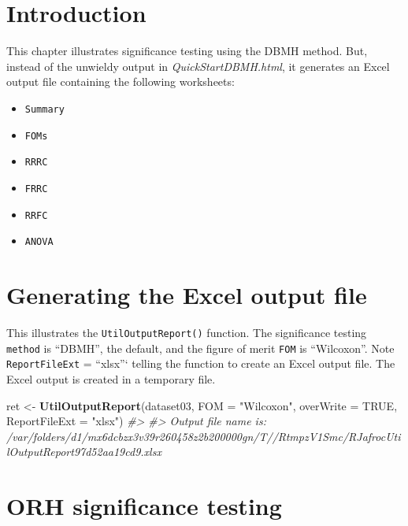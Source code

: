 \documentclass[
]{book}
\newenvironment{Shaded}{\begin{snugshade}}{\end{snugshade}}
\newcommand{\CommentTok}[1]{\textcolor[rgb]{0.56,0.35,0.01}{\textit{#1}}}
\newcommand{\DataTypeTok}[1]{\textcolor[rgb]{0.13,0.29,0.53}{#1}}
\newcommand{\KeywordTok}[1]{\textcolor[rgb]{0.13,0.29,0.53}{\textbf{#1}}}
\newcommand{\NormalTok}[1]{#1}
\newcommand{\OtherTok}[1]{\textcolor[rgb]{0.56,0.35,0.01}{#1}}
\newcommand{\StringTok}[1]{\textcolor[rgb]{0.31,0.60,0.02}{#1}}
\providecommand{\tightlist}{%
  \setlength{\itemsep}{0pt}\setlength{\parskip}{0pt}}
\begin{document}
\hypertarget{introduction-6}{%
\section{Introduction}\label{introduction-6}}

This chapter illustrates significance testing using the DBMH method. But, instead of the unwieldy output in \emph{QuickStartDBMH.html}, it generates an Excel output file containing the following worksheets:

\begin{itemize}
\tightlist
\item
  \texttt{Summary}
\item
  \texttt{FOMs}
\item
  \texttt{RRRC}
\item
  \texttt{FRRC}
\item
  \texttt{RRFC}
\item
  \texttt{ANOVA}
\end{itemize}

\hypertarget{generating-the-excel-output-file}{%
\section{Generating the Excel output file}\label{generating-the-excel-output-file}}

This illustrates the \texttt{UtilOutputReport()} function. The significance testing \texttt{method} is ``DBMH'', the default, and the figure of merit \texttt{FOM} is ``Wilcoxon''. Note \texttt{ReportFileExt} = ``xlsx''` telling
the function to create an Excel output file. The Excel output is created in a temporary file.

\begin{Shaded}
\begin{Highlighting}[]
\NormalTok{ret \textless{}{-}}\StringTok{ }\KeywordTok{UtilOutputReport}\NormalTok{(dataset03, }\DataTypeTok{FOM =} \StringTok{"Wilcoxon"}\NormalTok{, }\DataTypeTok{overWrite =} \OtherTok{TRUE}\NormalTok{, }\DataTypeTok{ReportFileExt =} \StringTok{"xlsx"}\NormalTok{)}
\CommentTok{\#\textgreater{} }
\CommentTok{\#\textgreater{} Output file name is:      /var/folders/d1/mx6dcbzx3v39r260458z2b200000gn/T//RtmpzV1Smc/RJafrocUtilOutputReport97d52aa19cd9.xlsx}
\end{Highlighting}
\end{Shaded}

\hypertarget{orh-significance-testing-1}{%
\section{ORH significance testing}\label{orh-significance-testing-1}}
\end{document}
